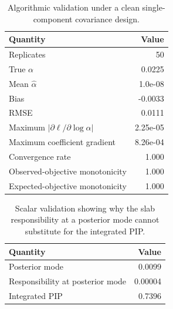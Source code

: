 \begin{table}[htbp]
\centering
\small
\setlength{\tabcolsep}{4pt}
\caption{Whitening and parameter-order sensitivity for the proposed estimator. Difference columns give averages or maxima across 50 replicates relative to precision-Cholesky whitening in the original order.}
\label{tab:supp-whitening}
\end{table}
 
\begin{table}[htbp]
\centering
\small
\setlength{\tabcolsep}{4pt}
\caption{Algorithmic validation under a clean single-component covariance design.}
\label{tab:supp-objective-validation}
\begin{tabular}{lr}
\toprule
Quantity & Value\\
\midrule 
Replicates & 50\\ 
True $\alpha$ & 0.0225\\ 
Mean $\widehat{\alpha}$ & 1.0e-08\\ 
Bias & -0.0033\\ 
RMSE & 0.0111\\ 
Maximum $|\partial \ell/\partial\log\alpha|$ & 2.25e-05\\ 
Maximum coefficient gradient & 8.26e-04\\ 
Convergence rate & 1.000\\ 
Observed-objective monotonicity & 1.000\\ 
Expected-objective monotonicity & 1.000\\ 
\bottomrule
\end{tabular}
\end{table}
 
\begin{table}[htbp]
\centering
\small
\setlength{\tabcolsep}{4pt}
\caption{Scalar validation showing why the slab responsibility at a posterior mode cannot substitute for the integrated PIP.}
\label{tab:supp-pip-validation}
\begin{tabular}{lr}
\toprule
Quantity & Value\\
\midrule 
Posterior mode & 0.0099\\ 
Responsibility at posterior mode & 0.00004\\ 
Integrated PIP & 0.7396\\ 
\bottomrule
\end{tabular}
\end{table}
 
